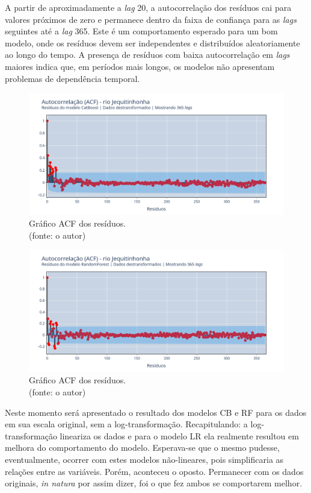 A partir de aproximadamente a \textit{lag} 20, a autocorrelação dos resíduos cai para valores próximos de zero e permanece dentro da faixa de confiança para as \textit{lags} seguintes até a \textit{lag} 365. Este é um comportamento esperado para um bom modelo, onde os resíduos devem ser independentes e distribuídos aleatoriamente ao longo do tempo. A presença de resíduos com baixa autocorrelação em \textit{lags} maiores indica que, em períodos mais longos, os modelos não apresentam problemas de dependência temporal.

\begin{figure}[!h]
\centering
\includegraphics[scale=0.33]{Figuras/jequiti/wfv/CB/CB_WFV_LOG_RESID_ACF.png}
\caption{Gráfico ACF dos resíduos.\\(fonte: o autor)}
\label{fig:jequiti_CB_WFV_LOG_RESID_ACF}
\end{figure}

\begin{figure}[!h]
\centering
\includegraphics[scale=0.33]{Figuras/jequiti/wfv/RF/RF_WFV_LOG_RESID_ACF.png}
\caption{Gráfico ACF dos resíduos.\\(fonte: o autor)}
\label{fig:jequiti_RF_WFV_LOG_RESID_ACF}
\end{figure}
\clearpage

Neste momento será apresentado o resultado dos modelos CB e RF para os dados em sua escala original, sem a log-transformação. Recapitulando: a log-transformação lineariza os dados e para o modelo LR ela realmente resultou em melhora do comportamento do modelo. Esperava-se que o mesmo pudesse, eventualmente, ocorrer com estes modelos não-lineares, pois simplificaria as relações entre as variáveis. Porém, aconteceu o oposto. Permanecer com os dados originais, \textit{in natura} por assim dizer, foi o que fez ambos se comportarem melhor.

